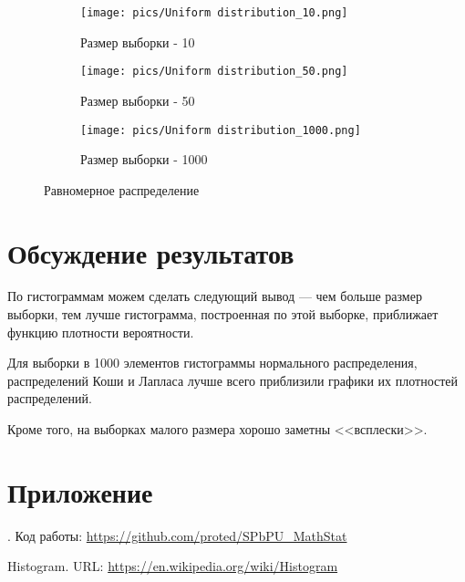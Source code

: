 \documentclass[a4paper, 14pt]{extreport}
\begin{document}
\begin{figure}
    \centering
    \begin{subfigure}[b]{0.5\textwidth}
    \texttt{[image: pics/Uniform distribution\_10.png]}
    \caption{Размер выборки - 10}
    \end{subfigure}
    
    \begin{subfigure}[b]{0.5\textwidth}
    \texttt{[image: pics/Uniform distribution\_50.png]}
    \caption{Размер выборки - 50}
    \end{subfigure}
    
    \begin{subfigure}[b]{0.5\textwidth}
    \texttt{[image: pics/Uniform distribution\_1000.png]}
    \caption{Размер выборки - 1000}
    \end{subfigure}
    \caption{Равномерное распределение}
    \label{fig:uniform}
\end{figure}

\chapter{Обсуждение результатов}

По гистограммам можем сделать следующий вывод --- чем больше размер выборки, тем лучше гистограмма, построенная по этой выборке, приближает функцию плотности вероятности.

Для выборки в 1000 элементов гистограммы нормального распределения, распределений Коши и Лапласа лучше всего приблизили графики их плотностей распределений.

Кроме того, на выборках малого размера хорошо заметны <<всплески>>.

\chapter{Приложение}

. Код работы: {\url{https://github.com/proted/SPbPU_MathStat}  \label{code}}

\begin{thebibliography}{1} 
	 Histogram. URL: {\url{https://en.wikipedia.org/wiki/Histogram}}
\end{thebibliography}
\end{document}
